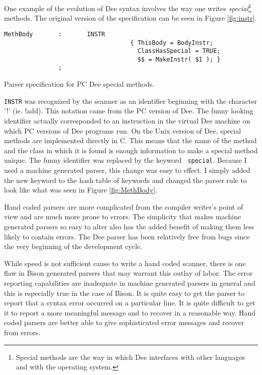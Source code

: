 One example of the evolution of Dee syntax involves the way one writes
{\em special\/}\footnote{Special methods are the way in which Dee
interfaces with other languages and with the operating system.}
methods. The original version of the specification can be seen in
Figure \ref{fig:instr}.

\begin{shortfigure}
\begin{verbatim}
MethBody       :       INSTR               
                                   { ThisBody = BodyInstr;
                                     ClassHasSpecial = TRUE;
                                     $$ = MakeInstr( $1 ); }
               ;
\end{verbatim}
\caption{Parser specification for PC Dee special methods.}
\label{fig:instr}
\end{shortfigure}

{\tt INSTR} was recognized by the scanner as an identifier beginning
with the character '!' (ie. !add).  This notation came from the PC
version of Dee.  The funny looking identifier actually corresponded to
an instruction in the virtual Dee machine on which PC versions of Dee
programs run.  On the Unix version of Dee, special methods are
implemented directly in C.  This means that the name of the method and
the class in which it is found is enough information to make a special
method unique.  The funny identifier was replaced by the keyword {\tt
special}.  Because I used a machine generated parser, this change was
easy to effect.  I simply added the new keyword to the hash table of
keywords and changed the parser rule to look like what was seen in
Figure \ref{fig:MethBody}.

Hand coded parsers are more complicated from the compiler writer's
point of view and are much more prone to errors.  The simplicity that
makes machine generated parsers so easy to alter also has the added
benefit of making them less likely to contain errors.  The Dee parser
has been relatively free from bugs since the very beginning of the
development cycle.

While speed is not sufficient cause to write a hand coded scanner,
there is one flaw in Bison generated parsers that may warrant
this outlay of labor.  The error reporting capabilities are inadequate
in machine generated parsers in general and this is especially true in
the case of Bison.  It is quite easy to get the parser to report
that a syntax error occurred on a particular line.  It is quite
difficult to get it to report a more meaningful message and to recover
in a reasonable way.  Hand coded parsers are better able to give
sophisticated error messages and recover from errors.



